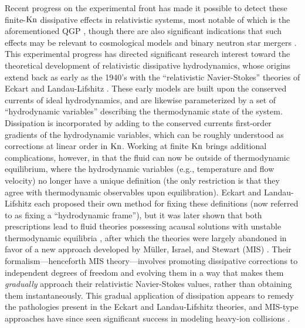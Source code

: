 \documentclass[%
notitlepage,
superscriptaddress,
nofootinbib,
amsmath,
amssymb,
aps,
twocolumn
]{revtex4-1}
\newcommand{\Kn}{\textnormal{Kn}}
\begin{document}
Recent progress on the experimental front has made it possible to detect
these finite-$\Kn$ dissipative effects in relativistic systems, most
notable of which is the aforementioned QGP \cite{Romatschke:2017ejr},
though there are also significant indications that such effects may be
relevant to cosmological models \cite{Brevik:2014cxa,Brevik:2017msy} and
binary neutron star mergers \cite{Alford_2018,Most2021bulk,Hammond:2021vtv,Camelio:2022ljs,Most:2022yhe}.
This experimental progress has directed significant research interest
toward the theoretical development of relativistic dissipative
hydrodynamics, whose origins extend back as early as the 1940's with the
``relativistic Navier-Stokes'' theories of Eckart \cite{Eckart_1940} and
Landau-Lifshitz \cite{Landau_1987}.  These early models are built upon the
conserved currents of ideal hydrodynamics, and are likewise parameterized
by a set of ``hydrodynamic variables'' describing the thermodynamic state
of the system.  Dissipation is incorporated by adding to the conserved
currents first-order gradients of the hydrodynamic variables, which can be
roughly understood as corrections at linear order in $\Kn$.  Working at
finite $\Kn$ brings additional complications, however, in that the fluid
can now be outside of thermodynamic equilibrium, where the hydrodynamic
variables (e.g., temperature and flow velocity) no longer have a unique definition (the only restriction is that
they agree with thermodynamic observables upon equilibration).  Eckart and
Landau-Lifshitz each proposed their own method for fixing these definitions
(now referred to as fixing a ``hydrodynamic frame''), but it was later
shown that both prescriptions lead to fluid theories possessing acausal
solutions with unstable thermodynamic equilibria
\cite{Hiscock_1985,Hiscock_1983}, after which the theories were largely
abandoned in favor of a new approach developed by M\"uller, Israel, and
Stewart (MIS) \cite{Muller_1967,Israel:1976tn,Israel_1979}.  Their
formalism---henceforth MIS theory---involves promoting dissipative
corrections to independent degrees of freedom and evolving them in a way
that makes them \textit{gradually} approach their relativistic
Navier-Stokes values, rather than obtaining them instantaneously.  This
gradual application of dissipation appears to remedy the pathologies
present in the Eckart and Landau-Lifshitz theories, and MIS-type approaches
have since seen significant success in modeling heavy-ion collisions
\cite{Romatschke:2017ejr,PHENIX:2017djs}.
\end{document}
